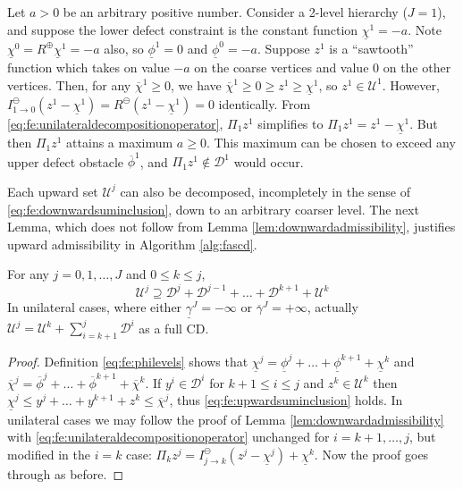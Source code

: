 \documentclass[review,hidelinks,onefignum,onetabnum]{siamart220329}
\newcommand{\maxR}{R^{\bm{\oplus}}}
\newcommand{\minR}{R^{\bm{\ominus}}}
\begin{document}
\begin{example}  \label{ex:notfullcd}
Let $a > 0$ be an arbitrary positive number.  Consider a 2-level hierarchy ($J=1$), and suppose the lower defect constraint is the constant function $\underline{\chi}^1=-a$.  Note $\underline{\chi}^0=\maxR \underline{\chi}^1=-a$ also, so $\underline{\phi}^1=0$ and $\underline{\phi}^0=-a$.  Suppose $z^1$ is a ``sawtooth'' function which takes on value $-a$ on the coarse vertices and value $0$ on the other vertices.  Then, for any $\overline{\chi}^1\ge 0$, we have $\overline{\chi}^1 \ge 0 \ge z^1\ge \underline{\chi}^1$, so $z^1 \in \mathcal{U}^1$.  However, $I_{1\to 0}^\ominus(z^1 - \underline{\chi}^1) = \minR(z^1 - \underline{\chi}^1) = 0$ identically.  From \eqref{eq:fe:unilateraldecompositionoperator}, $\Pi_1 z^1$ simplifies to $\Pi_1 z^1 = z^1 - \underline{\chi}^1$.  But then $\Pi_1 z^1$ attains a maximum $a\ge 0$.  This maximum can be chosen to exceed any upper defect obstacle $\overline{\phi}^1$, and $\Pi_1 z^1 \notin \mathcal{D}^1$ would occur.
\end{example}

Each upward set $\mathcal{U}^j$ can also be decomposed, incompletely in the sense of \eqref{eq:fe:downwardsuminclusion}, down to an arbitrary coarser level.  The next Lemma, which does not follow from Lemma \ref{lem:downwardadmissibility}, justifies upward admissibility in Algorithm \ref{alg:fascd}.

\begin{lemma}  \label{lem:upwardadmissibility}  For any $j=0,1,\dots,J$ and $0\le k\le j$,
\begin{equation}
\mathcal{U}^j \supseteq \mathcal{D}^j + \mathcal{D}^{j-1} + \dots + \mathcal{D}^{k+1} + \mathcal{U}^k \label{eq:fe:upwardsuminclusion}
\end{equation}
In unilateral cases, where either $\underline{\gamma}^J=-\infty$ or $\overline{\gamma}^J=+\infty$, actually $\mathcal{U}^j = \mathcal{U}^k + \sum_{i=k+1}^j \mathcal{D}^i$ as a full CD. \end{lemma}

\begin{proof}  Definition \eqref{eq:fe:philevels} shows that $\underline{\chi}^j = \underline{\phi}^j + \dots + \underline{\phi}^{k+1} + \underline{\chi}^k$ and $\overline{\chi}^j = \overline{\phi}^j + \dots + \overline{\phi}^{k+1} + \overline{\chi}^k$.  If $y^i \in \mathcal{D}^i$ for $k+1 \le i \le j$ and $z^k \in \mathcal{U}^k$ then $\underline{\chi}^j \le y^j + \dots + y^{k+1} + z^k \le \overline{\chi}^j$, thus \eqref{eq:fe:upwardsuminclusion} holds.  In unilateral cases we may follow the proof of Lemma \ref{lem:downwardadmissibility} with \eqref{eq:fe:unilateraldecompositionoperator} unchanged for $i=k+1,\dots,j$, but modified in the $i=k$ case: $\Pi_k z^j = I_{j\to k}^\ominus(z^j - \underline{\chi}^j) + \underline{\chi}^k$.  Now the proof goes through as before.
\end{proof}
\end{document}
